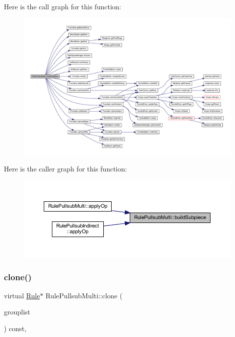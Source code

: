 Here is the call graph for this function\+:
\nopagebreak
\begin{figure}[H]
\begin{center}
\leavevmode
\includegraphics[width=350pt]{class_rule_pullsub_multi_a9195ceded3ce1f8d7d12bb52c8e268db_cgraph}
\end{center}
\end{figure}
Here is the caller graph for this function\+:
\nopagebreak
\begin{figure}[H]
\begin{center}
\leavevmode
\includegraphics[width=350pt]{class_rule_pullsub_multi_a9195ceded3ce1f8d7d12bb52c8e268db_icgraph}
\end{center}
\end{figure}
\mbox{\label{class_rule_pullsub_multi_ad97158dddae367b04cc50438c4380033}} 
\subsubsection{\texorpdfstring{clone()}{clone()}}
{\footnotesize\ttfamily virtual \mbox{\hyperlink{class_rule}{Rule}}$\ast$ Rule\+Pullsub\+Multi\+::clone (\begin{DoxyParamCaption}\item[{const \mbox{\hyperlink{class_action_group_list}{Action\+Group\+List}} \&}]{grouplist }\end{DoxyParamCaption}) const\hspace{0.3cm}{\ttfamily [inline]}, {\ttfamily [virtual]}}



